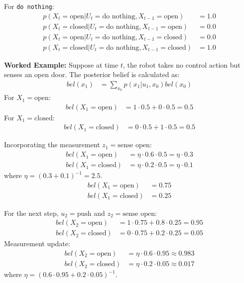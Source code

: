 \documentclass[12pt]{article}
\begin{document}
For \texttt{do nothing}:
\begin{align}
    p(X_t = \text{open} | U_t = \text{do nothing}, X_{t-1} = \text{open}) &= 1.0 \\
    p(X_t = \text{closed} | U_t = \text{do nothing}, X_{t-1} = \text{open}) &= 0.0 \\
    p(X_t = \text{open} | U_t = \text{do nothing}, X_{t-1} = \text{closed}) &= 0.0 \\
    p(X_t = \text{closed} | U_t = \text{do nothing}, X_{t-1} = \text{closed}) &= 1.0
\end{align}

\textbf{Worked Example:}
Suppose at time $t$, the robot takes no control action but senses an open door. The posterior belief is calculated as:
\begin{align}
    bel(x_1) &= \sum_{x_0} p(x_1 | u_1, x_0) bel(x_0)
\end{align}
For $X_1 = \text{open}$:
\begin{align}
    bel(X_1 = \text{open}) &= 1 \cdot 0.5 + 0 \cdot 0.5 = 0.5
\end{align}
For $X_1 = \text{closed}$:
\begin{align}
    bel(X_1 = \text{closed}) &= 0 \cdot 0.5 + 1 \cdot 0.5 = 0.5
\end{align}

Incorporating the measurement $z_1 = \text{sense open}$:
\begin{align}
    bel(X_1 = \text{open}) &= \eta \cdot 0.6 \cdot 0.5 = \eta \cdot 0.3 \\
    bel(X_1 = \text{closed}) &= \eta \cdot 0.2 \cdot 0.5 = \eta \cdot 0.1
\end{align}
where $\eta = (0.3 + 0.1)^{-1} = 2.5$.
\begin{align}
    bel(X_1 = \text{open}) &= 0.75 \\
    bel(X_1 = \text{closed}) &= 0.25
\end{align}

For the next step, $u_2 = \text{push}$ and $z_2 = \text{sense open}$:
\begin{align}
    bel(X_2 = \text{open}) &= 1 \cdot 0.75 + 0.8 \cdot 0.25 = 0.95 \\
    bel(X_2 = \text{closed}) &= 0 \cdot 0.75 + 0.2 \cdot 0.25 = 0.05
\end{align}
Measurement update:
\begin{align}
    bel(X_2 = \text{open}) &= \eta \cdot 0.6 \cdot 0.95 \approx 0.983 \\
    bel(X_2 = \text{closed}) &= \eta \cdot 0.2 \cdot 0.05 \approx 0.017
\end{align}
where $\eta = (0.6 \cdot 0.95 + 0.2 \cdot 0.05)^{-1}$.
\end{document}
